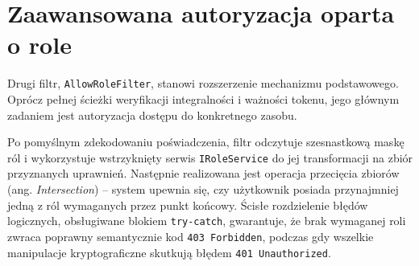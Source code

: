 \documentclass{SGGW-thesis}
\begin{document}
\section{Zaawansowana autoryzacja oparta o role}

Drugi filtr, \texttt{AllowRoleFilter}, stanowi rozszerzenie mechanizmu podstawowego. Oprócz pełnej ścieżki weryfikacji integralności i ważności tokenu, jego głównym zadaniem jest autoryzacja dostępu do konkretnego zasobu. 

Po pomyślnym zdekodowaniu poświadczenia, filtr odczytuje szesnastkową maskę ról i wykorzystuje wstrzyknięty serwis \texttt{IRoleService} do jej transformacji na zbiór przyznanych uprawnień. Następnie realizowana jest operacja przecięcia zbiorów (ang. \textit{Intersection}) – system upewnia się, czy użytkownik posiada przynajmniej jedną z ról wymaganych przez punkt końcowy. Ścisłe rozdzielenie błędów logicznych, obsługiwane blokiem \texttt{try-catch}, gwarantuje, że brak wymaganej roli zwraca poprawny semantycznie kod \texttt{403 Forbidden}, podczas gdy wszelkie manipulacje kryptograficzne skutkują błędem \texttt{401 Unauthorized}.

\vspace{2cm}
\end{document}
